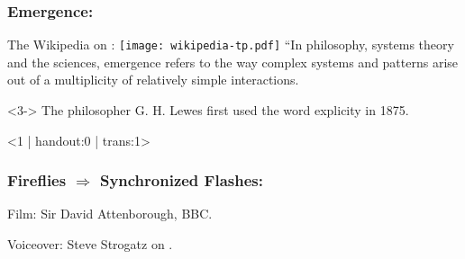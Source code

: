 

\begin{frame}
  \frametitle{Emergence:}

  \begin{block}{The Wikipedia on :
      \hfill
      \texttt{[image: wikipedia-tp.pdf]}
    }
    ``In philosophy, systems theory and the sciences, emergence refers to
    the way complex systems and patterns arise out of a multiplicity of
    relatively simple interactions. 
  \end{block}

\begin{block}<3->{}
    The philosopher G. H. Lewes first
    used the word explicity in 1875.
\end{block}

\end{frame}

\begin{frame}<1 | handout:0 | trans:1>
  \frametitle{Fireflies $\Rightarrow$ Synchronized Flashes:}


  \small

  Film: Sir David Attenborough, BBC.

  Voiceover: Steve Strogatz on 
  .

\end{frame}

